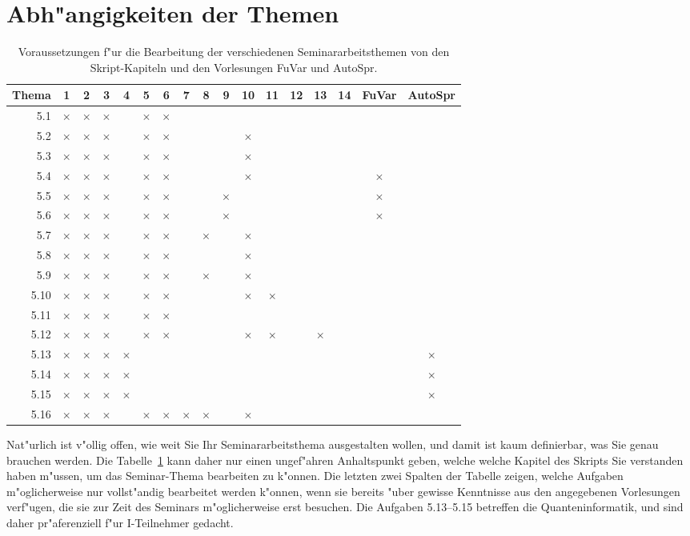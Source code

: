 \section{Abh"angigkeiten der Themen}
\def\x{$\times$}
\begin{table}
\centering
\begin{tabular}{|r|cccccccccccccc|cc|}
\hline
Thema& 1& 2& 3& 4& 5& 6& 7& 8& 9&10&11&12&13&14&FuVar&AutoSpr\\
\hline
  5.1&\x&\x&\x&  &\x&\x&  &  &  &  &  &  &  &  &     &       \\
  5.2&\x&\x&\x&  &\x&\x&  &  &  &\x&  &  &  &  &     &       \\
  5.3&\x&\x&\x&  &\x&\x&  &  &  &\x&  &  &  &  &     &       \\
  5.4&\x&\x&\x&  &\x&\x&  &  &  &\x&  &  &  &  &\x   &       \\
  5.5&\x&\x&\x&  &\x&\x&  &  &\x&  &  &  &  &  &\x   &       \\
  5.6&\x&\x&\x&  &\x&\x&  &  &\x&  &  &  &  &  &\x   &       \\
  5.7&\x&\x&\x&  &\x&\x&  &\x&  &\x&  &  &  &  &     &       \\
  5.8&\x&\x&\x&  &\x&\x&  &  &  &\x&  &  &  &  &     &       \\
  5.9&\x&\x&\x&  &\x&\x&  &\x&  &\x&  &  &  &  &     &       \\
 5.10&\x&\x&\x&  &\x&\x&  &  &  &\x&\x&  &  &  &     &       \\
 5.11&\x&\x&\x&  &\x&\x&  &  &  &  &  &  &  &  &     &       \\
 5.12&\x&\x&\x&  &\x&\x&  &  &  &\x&\x&  &\x&  &     &       \\
 5.13&\x&\x&\x&\x&  &  &  &  &  &  &  &  &  &  &     &\x     \\
 5.14&\x&\x&\x&\x&  &  &  &  &  &  &  &  &  &  &     &\x     \\
 5.15&\x&\x&\x&\x&  &  &  &  &  &  &  &  &  &  &     &\x     \\
 5.16&\x&\x&\x&  &\x&\x&\x&\x&  &\x&  &  &  &  &     &       \\
\hline
\end{tabular}
\caption{Voraussetzungen f"ur die Bearbeitung der verschiedenen
Seminararbeitsthemen von den Skript-Kapiteln und den Vorlesungen
FuVar und AutoSpr.
\label{tabelle}}
\end{table}
Nat"urlich ist v"ollig offen, wie weit Sie Ihr Seminararbeitsthema
ausgestalten wollen, und damit ist kaum definierbar, was Sie genau
brauchen werden.
Die Tabelle~\ref{tabelle} kann daher nur einen ungef"ahren Anhaltspunkt
geben, welche welche Kapitel des Skripts Sie verstanden haben m"ussen,
um das Seminar-Thema bearbeiten zu k"onnen.
Die letzten zwei Spalten der Tabelle zeigen, welche Aufgaben
m"oglicherweise nur vollst"andig bearbeitet werden k"onnen, wenn
sie bereits "uber gewisse Kenntnisse aus den angegebenen Vorlesungen
verf"ugen, die sie zur Zeit des Seminars m"oglicherweise erst besuchen.
Die Aufgaben 5.13--5.15 betreffen die Quanteninformatik, und sind
daher pr"aferenziell f"ur I-Teilnehmer gedacht.
